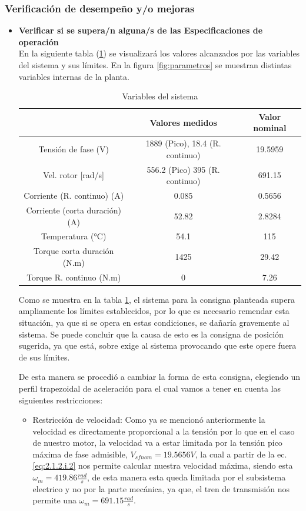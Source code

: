 \documentclass[10pt]{article}
\begin{document}
\subsubsection{Verificación de desempeño y/o mejoras}
\begin{itemize}
	\item \textbf{Verificar si se supera/n alguna/s de las Especificaciones de operación}\\
	En la siguiente tabla (\ref{tab:4}) se visualizará los valores alcanzados por las variables del sistema y sus límites. En la figura \ref{fig:parametros} se muestran distintas variables internas de la planta.
	\begin{table}[h!]
		\begin{center}
		\begin{tabular}{| c | c | c | }
		\hline
		  & Valores medidos & Valor nominal  \\ \hline
		 Tensión de fase (V) & 1889 (Pico), 18.4 (R. continuo) & 19.5959\\ \hline
		 Vel. rotor [rad/s]& 556.2 (Pico) 395 (R. continuo)&  691.15\\ \hline
		Corriente (R. continuo) (A) &0.085 & 0.5656\\ \hline
		Corriente (corta duración) (A) &52.82 &2.8284\\ \hline
		Temperatura (°C) &54.1 & 115\\ \hline
		Torque corta duración (N.m) & 1425 & 29.42\\ \hline
		Torque R. continuo (N.m) & 0 & 7.26\\ \hline
		\end{tabular}
		\caption{Variables del sistema}
		\label{tab:4}
		\end{center}
		\end{table}



Como se muestra en la tabla \ref{tab:4}, el sistema para la consigna planteada supera ampliamente los límites establecidos, por lo que es necesario remendar esta situación, ya que si se opera en estas condiciones, se dañaría gravemente al sistema.
Se puede concluir que la causa de esto es la consigna de posición sugerida, ya que está, sobre exige al sistema provocando que este opere fuera de sus límites.

 De esta manera se procedió a cambiar la forma de esta consigna, elegiendo un perfil trapezoidal de aceleración para el cual vamos a tener en cuenta las siguientes restricciones:

\begin{itemize}
	 \item Restricción de velocidad: Como ya se mencionó anteriormente la velocidad es directamente proporcional a la tensión por lo que en el caso de nuestro motor, la velocidad
	 va a estar limitada por la tensión pico máxima de fase admisible, \textbf{$V_{sfnom}=19.5656 V$}, la cual a partir de la ec.\ref{eq:2.1.2.i.2} nos permite calcular nuestra velocidad
	 máxima, siendo esta $\omega_{m}=419.86\frac{rad}{s}$, de esta manera esta queda limitada por el subsistema electrico y no por la parte mecánica, ya que, el tren de transmisión nos 
	 permite una $\omega_{m}=691.15\frac{rad}{s}$.


\end{itemize}
\end{itemize}
\end{document}

